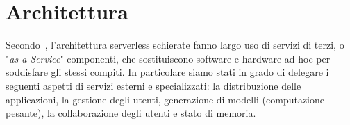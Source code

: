 \section{Architettura}
\label{sec:chapter_2_section_1}

Secondo~\cite{Roberts}, l'architettura serverless schierate fanno largo uso di servizi di terzi,
o "\emph{as-a-Service}" componenti, che sostituiscono software e hardware ad-hoc per soddisfare gli stessi compiti.
In particolare siamo stati in grado di delegare i seguenti aspetti di servizi esterni e specializzati:
la distribuzione delle applicazioni, la gestione degli utenti, generazione di modelli (computazione pesante),
la collaborazione degli utenti e stato di memoria.

